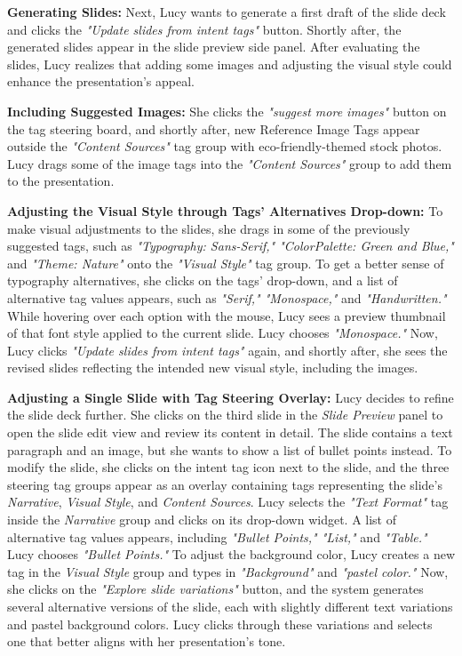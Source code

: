 \textbf{Generating Slides:}
Next, Lucy wants to generate a first draft of the slide deck and clicks the \textit{"Update slides from intent tags"} button. Shortly after, the generated slides appear in the slide preview side panel. After evaluating the slides, Lucy realizes that adding some images and adjusting the visual style could enhance the presentation's appeal. 

\textbf{Including Suggested Images:}
She clicks the \textit{"suggest more images"} button on the tag steering board, and shortly after, new Reference Image Tags appear outside the \textit{"Content Sources"} tag group with eco-friendly-themed stock photos. Lucy drags some of the image tags into the \textit{"Content Sources"} group to add them to the presentation.   

\textbf{Adjusting the Visual Style through Tags' Alternatives Drop-down:}
To make visual adjustments to the slides, she drags in some of the previously suggested tags, such as \textit{"Typography: Sans-Serif," "ColorPalette: Green and Blue,"} and \textit{"Theme: Nature"} onto the \textit{"Visual Style"} tag group. To get a better sense of typography alternatives, she clicks on the tags' drop-down, and a list of alternative tag values appears, such as \textit{"Serif," "Monospace,"} and \textit{"Handwritten."} While hovering over each option with the mouse, Lucy sees a preview thumbnail of that font style applied to the current slide. Lucy chooses \textit{"Monospace."} Now, Lucy clicks \textit{"Update slides from intent tags"} again, and shortly after, she sees the revised slides reflecting the intended new visual style, including the images. 

\textbf{Adjusting a Single Slide with Tag Steering Overlay:}
Lucy decides to refine the slide deck further. She clicks on the third slide in the \textit{Slide Preview} panel to open the slide edit view and review its content in detail. 
The slide contains a text paragraph and an image, but she wants to show a list of bullet points instead. 
To modify the slide, she clicks on the intent tag icon next to the slide, and the three steering tag groups appear as an overlay containing tags representing the slide's \textit{Narrative}, \textit{Visual Style}, and \textit{Content Sources}. 
Lucy selects the \textit{"Text Format"} tag inside the \textit{Narrative} group and clicks on its drop-down widget. 
A list of alternative tag values appears, including \textit{"Bullet Points," "List,"} and \textit{"Table."} Lucy chooses \textit{"Bullet Points."} 
To adjust the background color, Lucy creates a new tag in the \textit{Visual Style} group and types in \textit{"Background"} and \textit{"pastel color."} 
Now, she clicks on the \textit{"Explore slide variations"} button, and the system generates several alternative versions of the slide, each with slightly different text variations and pastel background colors.  
Lucy clicks through these variations and selects one that better aligns with her presentation’s tone.

